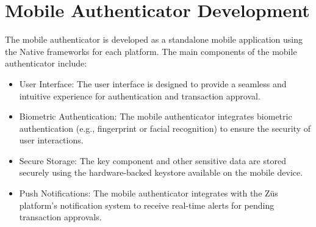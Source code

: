 \section{Mobile Authenticator Development}
The mobile authenticator is developed as a standalone mobile application using the Native frameworks for each platform. The main components of the mobile authenticator include:
\begin{itemize}
\item User Interface: The user interface is designed to provide a seamless and intuitive experience for authentication and transaction approval.
\item Biometric Authentication: The mobile authenticator integrates biometric authentication (e.g., fingerprint or facial recognition) to ensure the security of user interactions.
\item Secure Storage: The key component and other sensitive data are stored securely using the hardware-backed keystore available on the mobile device.
\item Push Notifications: The mobile authenticator integrates with the Züs platform's notification system to receive real-time alerts for pending transaction approvals.
\end{itemize}
